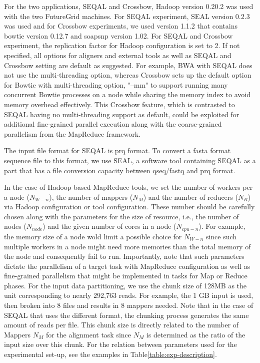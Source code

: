 \documentclass{sig-alternate}
\begin{document}
For the two applications, SEQAL and Crossbow, Hadoop version 0.20.2 was used with the two FutureGrid machines.  For SEQAL experiment, SEAL version 0.2.3 was used and for Crossbow experiments, we used version 1.1.2 that contains bowtie version 0.12.7 and soapsnp version 1.02.  For SEQAL and Crossbow experiment, the replication factor for Hadoop configuration is set  to 2.  If not specified, all options for aligners and external tools as well as SEQAL and Crossbow setting are default as suggested.  For example, BWA with SEQAL does not use the multi-threading option, whereas Crossbow sets up the default option for Bowtie with multi-threading option, "--mm" to support running many concurrent Bowtie processes on a node while sharing the memory index to avoid memory overhead effectively.  This Crossbow feature, which is contrasted to SEQAL having no multi-threading support as default, could be exploited for additional fine-grained parallel execution along with the coarse-grained parallelism from the MapReduce framework.

The input file format for SEQAL is prq format.  To convert a fasta format sequence file to this format, we use SEAL, a software tool containing SEQAL as a part that has a file conversion capacity between qseq/fastq and prq format.  

In the case of Hadoop-based MapReduce tools, we set the number of workers per a node ($N_{W-n}$), the number of mappers ($N_M$) and the number of reducers ($N_R$) via Hadoop configuration or tool configuration.  These number should be carefully chosen along with the parameters for the size of resource, i.e., the number of nodes ($N_{node}$) and the given number of cores in a node ($N_{cpu-n}$).  For example, the memory size of a node wold limit a possible choice for $N_{W-n}$ since such multiple workers in a node might need more memories than the total memory of the node and consequently fail to run.  Importantly, note that such parameters dictate the parallelism of a target task with MapReduce configuration as well as fine-grained parallelism that might be implemented in tasks for Map or Reduce phases.  For the input data partitioning, we use the chunk size of 128MB as the unit corresponding to nearly 292,763 reads. For example, the 1 GB input is used, then broken into 8 files and results in 8 mappers needed.  Note that in the case of SEQAL that uses the different format, the chunking process generates the same amount of reads per file.  This chunk size is directly related to the number of Mappers $N_M$ for the alignment task since  $N_M$ is determined as the ratio of the input size over this chunk.   For the relation between parameters used for the experimental set-up, see the examples in Table\ref{table:exp-description}. 
%
\end{document}
